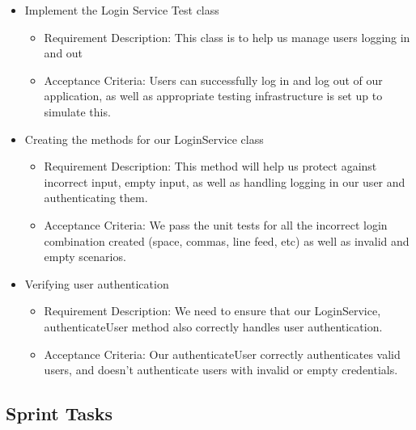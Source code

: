 \documentclass{scrreprt}
\begin{document}
\begin{itemize}
    \item Implement the Login Service Test class
    \begin{itemize}
        \item Requirement Description: This class is to help us manage users logging in and out
        \item Acceptance Criteria: Users can successfully log in and log out of our application, as well as appropriate testing infrastructure is set up to simulate this.
    \end{itemize}
    \item Creating the methods for our LoginService class
    \begin{itemize}
        \item Requirement Description: This method will help us protect against incorrect input, empty input, as well as handling logging in our user and authenticating them.
        \item Acceptance Criteria: We pass the unit tests for all the incorrect login combination created (space, commas, line feed, etc) as well as invalid and empty scenarios.
    \end{itemize}
    \item Verifying user authentication
    \begin{itemize}
        \item Requirement Description: We need to ensure that our LoginService, authenticateUser method also correctly handles user authentication.
        \item Acceptance Criteria: Our authenticateUser correctly authenticates valid users, and doesn't authenticate users with invalid or empty credentials.
    \end{itemize}
\end{itemize}

% 
\subsection{Sprint Tasks}
\end{document}
